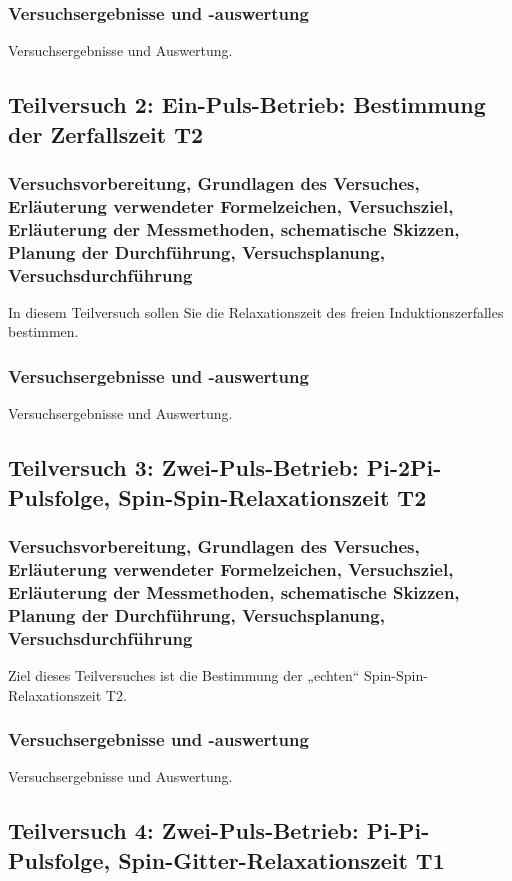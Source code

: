 \documentclass[12pt,oneside,oldfontcommands]{memoir}
\begin{document}
\subsubsection{Versuchsergebnisse und -auswertung}
Versuchsergebnisse und Auswertung.

\subsection{Teilversuch 2: Ein-Puls-Betrieb: Bestimmung der Zerfallszeit T2}
\subsubsection{Versuchsvorbereitung, Grundlagen des Versuches, Erläuterung verwendeter Formelzeichen, Versuchsziel, Erläuterung der Messmethoden, schematische Skizzen, Planung der Durchführung, Versuchsplanung, Versuchsdurchführung}
In diesem Teilversuch sollen Sie die Relaxationszeit des freien Induktionszerfalles bestimmen.

\subsubsection{Versuchsergebnisse und -auswertung}
Versuchsergebnisse und Auswertung.

\subsection{Teilversuch 3: Zwei-Puls-Betrieb: Pi-2Pi-Pulsfolge, Spin-Spin-Relaxationszeit T2}
\subsubsection{Versuchsvorbereitung, Grundlagen des Versuches, Erläuterung verwendeter Formelzeichen, Versuchsziel, Erläuterung der Messmethoden, schematische Skizzen, Planung der Durchführung, Versuchsplanung, Versuchsdurchführung}
Ziel dieses Teilversuches ist die Bestimmung der „echten“ Spin-Spin-Relaxationszeit T2.

\subsubsection{Versuchsergebnisse und -auswertung}
Versuchsergebnisse und Auswertung.

\subsection{Teilversuch 4: Zwei-Puls-Betrieb: Pi-Pi-Pulsfolge, Spin-Gitter-Relaxationszeit T1}
\end{document}
